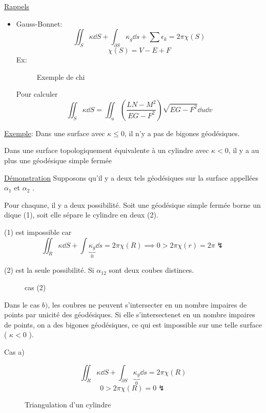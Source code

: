 


\underline{Rappels}

\begin{itemize}
	\item Gauss-Bonnet: $$\iint_S \kappa \dd S + \int_{\partial S} \kappa_g \dd s + \sum\epsilon_k = 2\pi \chi(S) $$ $$\chi(S) = V-E+F$$  Ex: 
\begin{figure}[ht]
    \centering
    \caption{Exemple de chi}
    \label{fig:exemple-de-chi}
\end{figure}

Pour calculer $$\iint_S \kappa \dd S = \iint_u \left( \frac{LN-M^2}{EG-F^2}  \right) \sqrt{EG -F^2} \dd u \dd v$$  
\end{itemize}

\underline{Exemple}: Dans une surface avec $\kappa \leq 0$, il n'y a pas de bigones géodésiques.

Dans une surface topologiquement équivalente à un cylindre avec $\kappa < 0$, il y a au plus une géodésique simple fermée 

\underline{Démonstration}
Supposons qu'il y a deux tels géodésiques sur la surface appellées $\alpha_1$ et $\alpha_2$ .

Pour chaqune, il y a deux possibilité. Soit une géodésique simple fermée borne un dique (1), soit elle sépare le cylindre en deux (2).

(1) est impossible car 
$$\iint_R \kappa \dd S + \int \underbrace{\kappa_{g}}_{0} \dd s = 2 \pi \chi(R)  \implies 0> 2\pi \chi(r) = 2\pi \lightning$$ 

(2) est la seule possibilité. Si $\alpha_{12} $ sont deux coubes distinces.
\begin{figure}[ht]
    \centering
    \caption{cas (2)}
    \label{fig:cas-(2)}
\end{figure}

Dans le cas $b)$, les coubres ne peuvent s'intersecter en un nombre impaires de points par unicité des géodésiques. Si elle s'intersectenet en un nombre impaires de points, on a des bigones géodésiques, ce qui est impossible sur une telle surface ( $\kappa <0$ ).

Cas a)

$$\iint_R \kappa \dd S + \int_{\partial S} \underbrace{\kappa_g}_{0}  \dd s = 2\pi \chi(R)$$ 
$$0> 2\pi\chi(R) = 0 \lightning$$ 

\begin{figure}[ht]
    \centering
    \caption{Triangulation d'un cylindre}
    \label{fig:triangulation-d'un-cylindre}
\end{figure}


